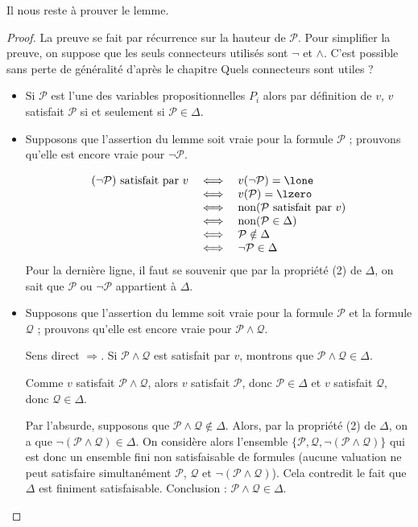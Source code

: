 \documentclass[11pt,class=report,crop=false]{standalone}
\begin{document}
Il nous reste à prouver le lemme.
\begin{proof}
La preuve se fait par récurrence sur la hauteur de $\mathcal{P}$.
Pour simplifier la preuve, on suppose que les seuls connecteurs utilisés sont $\lnot$ et $\land$. C'est possible sans perte de généralité d'après le chapitre \og{}Quels connecteurs sont utiles ?\fg{}

\begin{itemize}
	\item Si $\mathcal{P}$ est l'une des variables propositionnelles $P_i$ alors par définition de $v$, $v$ satisfait $\mathcal{P}$ si et seulement si $\mathcal{P} \in \Delta$.
	
	\item Supposons que l'assertion du lemme soit vraie pour la formule $\mathcal{P}$ ; prouvons qu'elle est encore vraie pour $\lnot \mathcal{P}$.
	
	\[
	\begin{array}{rcl}
		(\lnot \mathcal{P}) \text{ satisfait par } v 
		& \iff & v(\lnot \mathcal{P}) = \lone \\
		& \iff & v(\mathcal{P}) = \lzero \\
		& \iff & \text{non($\mathcal{P}$ satisfait par $v$)} \\
		& \iff & \text{non}(\mathcal{P} \in \Delta) \\
		& \iff & \mathcal{P} \notin \Delta \\
		& \iff & \lnot \mathcal{P} \in \Delta \\
	\end{array}	
	\]
	 Pour la dernière ligne, il faut se souvenir que par la propriété (2) de $\Delta$, on sait que $\mathcal{P}$ ou $\lnot \mathcal{P}$ appartient à $\Delta$.
	
	\item Supposons que l'assertion du lemme soit vraie pour la formule $\mathcal{P}$ et la formule $\mathcal{Q}$ ; prouvons qu'elle est encore vraie pour $\mathcal{P} \land \mathcal{Q}$.
	
	\medskip
	
	Sens direct $\Rightarrow$.
	Si $\mathcal{P} \land \mathcal{Q}$ est satisfait par $v$, montrons que $\mathcal{P} \land \mathcal{Q} \in \Delta$.
	
	Comme $v$ satisfait $\mathcal{P} \land \mathcal{Q}$, alors $v$ satisfait $\mathcal{P}$, donc $\mathcal{P} \in \Delta$ et $v$ satisfait $\mathcal{Q}$, donc $\mathcal{Q} \in \Delta$.
	
	Par l'absurde, supposons que $\mathcal{P} \land \mathcal{Q} \notin \Delta$.
	Alors, par la propriété (2) de $\Delta$, on a que $\lnot (\mathcal{P} \land \mathcal{Q}) \in \Delta$.
	On considère alors l'ensemble $\{ \mathcal{P}, \mathcal{Q}, \lnot (\mathcal{P} \land \mathcal{Q}) \}$ qui est donc un ensemble fini non satisfaisable de formules (aucune valuation ne peut satisfaire simultanément $\mathcal{P}$, $\mathcal{Q}$ et $\lnot (\mathcal{P} \land \mathcal{Q})$). Cela contredit le fait que $\Delta$ est finiment satisfaisable.
	Conclusion : $\mathcal{P} \land \mathcal{Q} \in \Delta$.
	

\end{itemize}
\end{proof}
\end{document}
